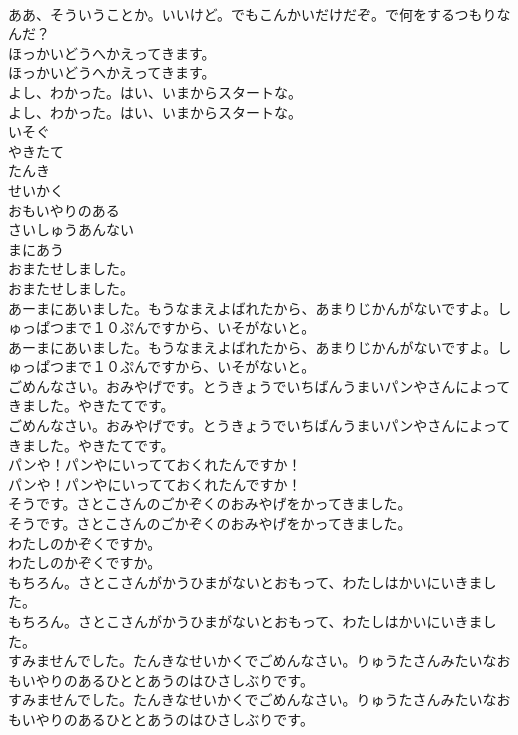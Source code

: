 \documentclass[8pt]{extreport}
\begin{document}
\begin{CJK}{UTF8}{min}
\\	ああ、そういうことか。いいけど。でもこんかいだけだぞ。で何をするつもりなんだ？ 
\\	ほっかいどうへかえってきます。	
\\	ほっかいどうへかえってきます。 
\\	よし、わかった。はい、いまからスタートな。	
\\	よし、わかった。はい、いまからスタートな。 
\\	いそぐ
\\	やきたて
\\	たんき
\\	せいかく
\\	おもいやりのある
\\	さいしゅうあんない
\\	まにあう
\\	おまたせしました。	
\\	おまたせしました。 
\\	あーまにあいました。もうなまえよばれたから、あまりじかんがないですよ。しゅっぱつまで１０ぷんですから、いそがないと。	
\\	あーまにあいました。もうなまえよばれたから、あまりじかんがないですよ。しゅっぱつまで１０ぷんですから、いそがないと。 
\\	ごめんなさい。おみやげです。とうきょうでいちばんうまいパンやさんによってきました。やきたてです。	
\\	ごめんなさい。おみやげです。とうきょうでいちばんうまいパンやさんによってきました。やきたてです。 
\\	パンや！パンやにいってておくれたんですか！	
\\	パンや！パンやにいってておくれたんですか！ 
\\	そうです。さとこさんのごかぞくのおみやげをかってきました。	
\\	そうです。さとこさんのごかぞくのおみやげをかってきました。 
\\	わたしのかぞくですか。	
\\	わたしのかぞくですか。 
\\	もちろん。さとこさんがかうひまがないとおもって、わたしはかいにいきました。	
\\	もちろん。さとこさんがかうひまがないとおもって、わたしはかいにいきました。 
\\	すみませんでした。たんきなせいかくでごめんなさい。りゅうたさんみたいなおもいやりのあるひととあうのはひさしぶりです。	
\\	すみませんでした。たんきなせいかくでごめんなさい。りゅうたさんみたいなおもいやりのあるひととあうのはひさしぶりです。 

\end{CJK}
\end{document}
